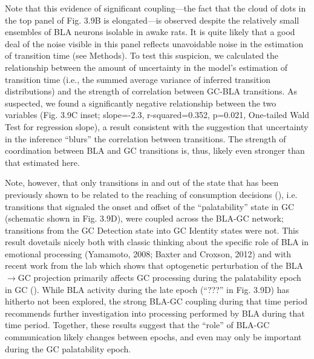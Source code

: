 \begin{refsection}
Note that this evidence of significant coupling—the fact that the cloud of dots in the top panel of Fig. 3.9B is elongated—is observed despite the relatively small ensembles of BLA neurons isolable in awake rats. It is quite likely that a good deal of the noise visible in this panel reflects unavoidable noise in the estimation of transition time (see Methods). To test this suspicion, we calculated the relationship between the amount of uncertainty in the model’s estimation of transition time (i.e., the summed average variance of inferred transition distributions) and the strength of correlation between GC-BLA transitions. As suspected, we found a significantly negative relationship between the two variables (Fig. 3.9C inset; slope=-2.3, r-squared=0.352, p=0.021, One-tailed Wald Test for regression slope), a result consistent with the suggestion that uncertainty in the inference “blurs” the correlation between transitions. The strength of coordination between BLA and GC transitions is, thus, likely even stronger than that estimated here.

Note, however, that only transitions in and out of the state that has been previously shown to be related to the reaching of consumption decisions (\cite{sadacca2016a}), i.e. transitions that signaled the onset and offset of the “palatability” state in GC (schematic shown in Fig. 3.9D), were coupled across the BLA-GC network; transitions from the GC Detection state into GC Identity states were not. This result dovetails nicely both with classic thinking about the specific role of BLA in emotional processing (Yamamoto, 2008; Baxter and Croxson, 2012) and with recent work from the lab which shows that optogenetic perturbation of the BLA$\rightarrow$GC projection primarily affects GC processing during the palatability epoch in GC (\cite{lin2021a}). While BLA activity during the late epoch (“???” in Fig. 3.9D) has hitherto not been explored, the strong BLA-GC coupling during that time period recommends further investigation into processing performed by BLA during that time period. Together, these results suggest that the “role” of BLA-GC communication likely changes between epochs, and even may only be important during the GC palatability epoch.


\end{refsection}
